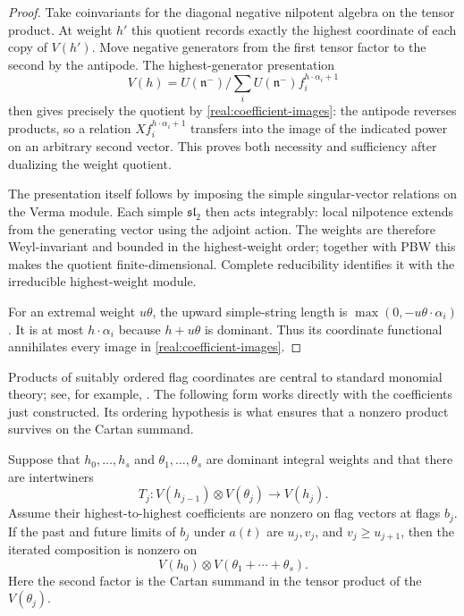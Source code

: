 \begin{proof}
Take coinvariants for the diagonal negative nilpotent algebra on the
tensor product.  At weight $h'$ this quotient records exactly the
highest coordinate of each copy of $V(h')$.  Move negative generators
from the first tensor factor to the second by the antipode.  The
highest-generator presentation
\[
 V(h)=U(\mathfrak n^-)
 \Big/\sum_i U(\mathfrak n^-)f_i^{h\cdot\alpha_i+1}
\]
then gives precisely the quotient by
\eqref{real:coefficient-images}: the antipode reverses products, so a
relation $Xf_i^{h\cdot\alpha_i+1}$ transfers into the image of the
indicated power on an arbitrary second vector.  This proves both
necessity and sufficiency after dualizing the weight quotient.

The presentation itself follows by imposing the simple singular-vector
relations on the Verma module.  Each simple $\mathfrak{sl}_2$ then
acts integrably: local nilpotence extends from the generating vector
using the adjoint action.  The weights are therefore Weyl-invariant
and bounded in the highest-weight order; together with PBW this makes
the quotient finite-dimensional.  Complete reducibility identifies
it with the irreducible highest-weight module.

For an extremal weight $u\theta$, the upward simple-string length is
$\max(0,-u\theta\cdot\alpha_i)$.  It is at most
$h\cdot\alpha_i$ because $h+u\theta$ is dominant.  Thus its
coordinate functional annihilates every image in
\eqref{real:coefficient-images}.
\end{proof}

Products of suitably ordered flag coordinates are central to standard
monomial theory; see, for example, \cite[Theorem~4]{Lit98}. The
following form works directly with the coefficients just constructed.
Its ordering hypothesis is what ensures that a nonzero product survives
on the Cartan summand.

\begin{lemma}\label{lem:flag-composition}
Suppose that $h_0,\ldots,h_s$ and $\theta_1,\ldots,\theta_s$ are
dominant integral weights and that there are intertwiners
\[
 T_j:V(h_{j-1})\otimes V(\theta_j)\longrightarrow V(h_j).
\]
Assume their highest-to-highest coefficients are nonzero on flag
vectors at flags $b_j$.  If the past and future limits of $b_j$ under
$a(t)$ are $u_j,v_j$, and $v_j\ge u_{j+1}$, then the iterated
composition is nonzero on
\[
 V(h_0)\otimes V(\theta_1+\cdots+\theta_s).
\]
Here the second factor is the Cartan summand in the tensor product of
the $V(\theta_j)$.
\end{lemma}

